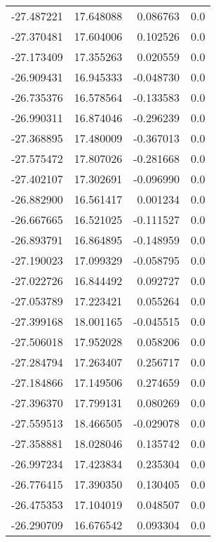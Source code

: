 \begin{tabular}{rrrr}
      -27.487221 &        17.648088 &    0.086763 &   0.0 \\
      -27.370481 &        17.604006 &    0.102526 &   0.0 \\
      -27.173409 &        17.355263 &    0.020559 &   0.0 \\
      -26.909431 &        16.945333 &   -0.048730 &   0.0 \\
      -26.735376 &        16.578564 &   -0.133583 &   0.0 \\
      -26.990311 &        16.874046 &   -0.296239 &   0.0 \\
      -27.368895 &        17.480009 &   -0.367013 &   0.0 \\
      -27.575472 &        17.807026 &   -0.281668 &   0.0 \\
      -27.402107 &        17.302691 &   -0.096990 &   0.0 \\
      -26.882900 &        16.561417 &    0.001234 &   0.0 \\
      -26.667665 &        16.521025 &   -0.111527 &   0.0 \\
      -26.893791 &        16.864895 &   -0.148959 &   0.0 \\
      -27.190023 &        17.099329 &   -0.058795 &   0.0 \\
      -27.022726 &        16.844492 &    0.092727 &   0.0 \\
      -27.053789 &        17.223421 &    0.055264 &   0.0 \\
      -27.399168 &        18.001165 &   -0.045515 &   0.0 \\
      -27.506018 &        17.952028 &    0.058206 &   0.0 \\
      -27.284794 &        17.263407 &    0.256717 &   0.0 \\
      -27.184866 &        17.149506 &    0.274659 &   0.0 \\
      -27.396370 &        17.799131 &    0.080269 &   0.0 \\
      -27.559513 &        18.466505 &   -0.029078 &   0.0 \\
      -27.358881 &        18.028046 &    0.135742 &   0.0 \\
      -26.997234 &        17.423834 &    0.235304 &   0.0 \\
      -26.776415 &        17.390350 &    0.130405 &   0.0 \\
      -26.475353 &        17.104019 &    0.048507 &   0.0 \\
      -26.290709 &        16.676542 &    0.093304 &   0.0 \\

\end{tabular}
